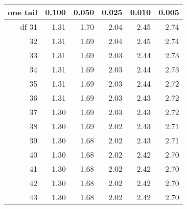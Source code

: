 \begin{center}
\begin{tabular}{r | rrr rr}
one tail & \hspace{1.5mm}  0.100 & \hspace{1.5mm} 0.050 & \hspace{1.5mm} 0.025 & \hspace{1.5mm} 0.010 & \hspace{1.5mm} 0.005  \\
\hline
{df} \hfill 31  &  {\normalsize  1.31} & {\normalsize  1.70} & {\normalsize  2.04} & {\normalsize  2.45} & {\normalsize  2.74}  \\ 
32  &  {\normalsize  1.31} & {\normalsize  1.69} & {\normalsize  2.04} & {\normalsize  2.45} & {\normalsize  2.74}  \\ 
33  &  {\normalsize  1.31} & {\normalsize  1.69} & {\normalsize  2.03} & {\normalsize  2.44} & {\normalsize  2.73}  \\ 
34  &  {\normalsize  1.31} & {\normalsize  1.69} & {\normalsize  2.03} & {\normalsize  2.44} & {\normalsize  2.73}  \\ 
35  &  {\normalsize  1.31} & {\normalsize  1.69} & {\normalsize  2.03} & {\normalsize  2.44} & {\normalsize  2.72}  \\ 
\hline
36  &  {\normalsize  1.31} & {\normalsize  1.69} & {\normalsize  2.03} & {\normalsize  2.43} & {\normalsize  2.72}  \\ 
37  &  {\normalsize  1.30} & {\normalsize  1.69} & {\normalsize  2.03} & {\normalsize  2.43} & {\normalsize  2.72}  \\ 
38  &  {\normalsize  1.30} & {\normalsize  1.69} & {\normalsize  2.02} & {\normalsize  2.43} & {\normalsize  2.71}  \\ 
39  &  {\normalsize  1.30} & {\normalsize  1.68} & {\normalsize  2.02} & {\normalsize  2.43} & {\normalsize  2.71}  \\ 
40  &  {\normalsize  1.30} & {\normalsize  1.68} & {\normalsize  2.02} & {\normalsize  2.42} & {\normalsize  2.70}  \\ 
\hline
\hline
41  &  {\normalsize  1.30} & {\normalsize  1.68} & {\normalsize  2.02} & {\normalsize  2.42} & {\normalsize  2.70}  \\ 
42  &  {\normalsize  1.30} & {\normalsize  1.68} & {\normalsize  2.02} & {\normalsize  2.42} & {\normalsize  2.70}  \\ 
43  &  {\normalsize  1.30} & {\normalsize  1.68} & {\normalsize  2.02} & {\normalsize  2.42} & {\normalsize  2.70}  \\ 

\end{tabular}
\end{center}
